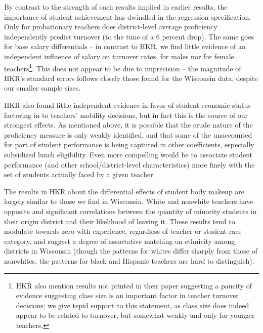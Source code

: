 \documentclass[]{article}
\let\rmarkdownfootnote\footnote%
\def\footnote{\protect\rmarkdownfootnote}
\begin{document}
By contrast to the strength of such results implied in earlier results,
the importance of student achievement has dwindled in the regression
specification. Only for probationary teachers does district-level
average proficiency independently predict turnover (to the tune of a 6
percent drop). The same goes for base salary differentials -- in
contrast to HKR, we find little evidence of an independent influence of
salary on turnover rates, for males nor for female teachers\footnote{HKR
  also mention results not printed in their paper suggesting a paucity
  of evidence suggesting class size is an important factor in teacher
  turnover decisions; we give tepid support to this statement, as class
  size does indeed appear to be related to turnover, but somewhat weakly
  and only for younger teachers.}. This does not appear to be due to
imprecision -- the magnitude of HKR's standard errors follows closely
those found for the Wisconsin data, despite our smaller sample sizes.

HKR also found little independent evidence in favor of student economic
status factoring in to teachers' mobility decisions, but in fact this is
the source of our strongest effects. As mentioned above, it is possible
that the crude nature of the proficiency measure is only weakly
identified, and that some of the unaccounted for part of student
performance is being captured in other coefficients, especially
subsidized lunch eligibility. Even more compelling would be to associate
student performance (and other school/district-level characteristics)
more finely with the set of students actually faced by a given teacher.

The results in HKR about the differential effects of student body makeup
are largely similar to those we find in Wisconsin. White and nonwhite
teachers have opposite and significant correlations between the quantity
of minority students in their origin district and their likelihood of
leaving it. These results tend to modulate towards zero with experience,
regardless of teacher or student race category, and suggest a degree of
assortative matching on ethnicity among districts in Wisconsin (though
the patterns for whites differ sharply from those of nonwhites, the
patterns for black and Hispanic teachers are hard to distinguish).
\end{document}
